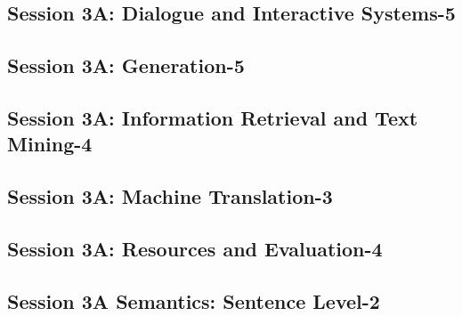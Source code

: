 \subsection{\large Session 3A: Dialogue and Interactive Systems-5}
\label{parallel-session-3A-trackC}
\TrackCLoc\hfill\sessionchair{}{}
\clearpage
\subsection{\large Session 3A: Generation-5}
\label{parallel-session-3A-trackD}
\TrackDLoc\hfill\sessionchair{}{}
\clearpage
\subsection{\large Session 3A: Information Retrieval and Text Mining-4}
\label{parallel-session-3A-trackE}
\TrackELoc\hfill\sessionchair{}{}
\clearpage
\subsection{\large Session 3A: Machine Translation-3}
\label{parallel-session-3A-trackF}
\TrackFLoc\hfill\sessionchair{}{}
\clearpage
\subsection{\large Session 3A: Resources and Evaluation-4}
\label{parallel-session-3A-trackG}
\TrackGLoc\hfill\sessionchair{}{}
\clearpage
\subsection{\large Session 3A Semantics: Sentence Level-2}
\label{parallel-session-3A-trackH}
\TrackHLoc\hfill\sessionchair{}{}
\clearpage


